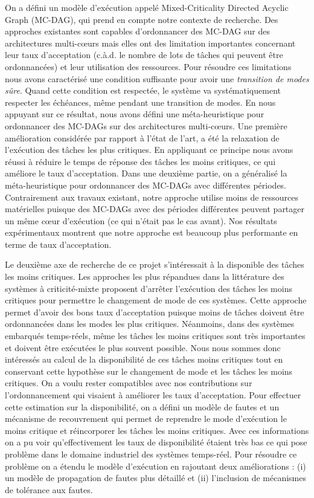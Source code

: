 \documentclass{article}
\begin{document}
\vspace{.5cm}
On a défini un modèle d'exécution appelé Mixed-Criticality Directed Acyclic Graph (MC-DAG), qui prend en 
compte notre contexte de recherche. Des approches existantes sont capables d'ordonnancer des MC-DAG 
sur des architectures multi-c\oe{}urs  mais elles ont des limitation importantes concernant leur taux 
d'acceptation (c.à.d. le nombre de lots de tâches qui peuvent être ordonnancées) et leur utilisation des 
ressources. Pour résoudre ces limitations nous avons caractérisé une condition suffisante pour avoir une 
\textit{transition de modes sûre}. Quand cette condition est respectée, le système va systématiquement 
respecter les échéances, même pendant une transition de modes. En nous appuyant sur ce résultat, 
nous avons défini une méta-heuristique pour ordonnancer des MC-DAGs sur des architectures 
multi-c\oe{}urs. Une première amélioration considérée par rapport à l'état de l'art, a été la relaxation de 
l'exécution des tâches les plus critiques. En appliquant ce principe nous avons réussi à réduire le temps de 
réponse des tâches les moins critiques, ce qui améliore le taux d'acceptation. Dans une deuxième partie, on a 
généralisé la méta-heuristique pour ordonnancer des MC-DAGs avec différentes périodes. Contrairement 
aux travaux existant, notre approche utilise moins de ressources matérielles puisque des MC-DAGs avec des 
périodes différentes peuvent partager un même c\oe{}ur d'exécution (ce qui n'était pas le cas avant). Nos 
résultats expérimentaux montrent que notre approche est beaucoup plus performante en terme de taux 
d'acceptation.

Le deuxième axe de recherche de ce projet s'intéressait à la disponible des tâches les moins critiques. Les 
approches les plus répandues dans la littérature des systèmes à criticité-mixte proposent d'arrêter 
l'exécution des tâches les moins critiques pour permettre le changement de mode de ces systèmes. Cette 
approche permet d'avoir des bons taux d'acceptation puisque moins de tâches doivent être ordonnancées 
dans les modes les plus critiques. Néanmoins, dans des systèmes embarqués temps-réels, même les tâches 
les 
moins critiques sont très 
importantes et doivent être exécutées le plus souvent possible. Nous nous sommes donc intéressés au calcul 
de la disponibilité de ces tâches moins critiques tout en conservant cette hypothèse sur le changement de 
mode et les tâches les moins critiques. On a voulu rester compatibles avec nos contributions sur 
l'ordonnancement qui visaient à améliorer les taux d'acceptation. Pour effectuer cette estimation sur la 
disponibilité, on a défini un modèle de fautes et un mécanisme de recouvrement qui permet de reprendre le 
mode d'exécution le moins critique et réincorporer les tâches les moins critiques. Avec ces informations on a 
pu voir qu'effectivement les taux de disponibilité étaient très bas ce qui pose problème dans le domaine 
industriel des systèmes temps-réel. Pour résoudre ce problème on a étendu le modèle d'exécution en 
rajoutant deux améliorations : (i) un modèle de propagation de fautes plus détaillé et (ii) l'inclusion de 
mécanismes de tolérance aux fautes.
\end{document}
